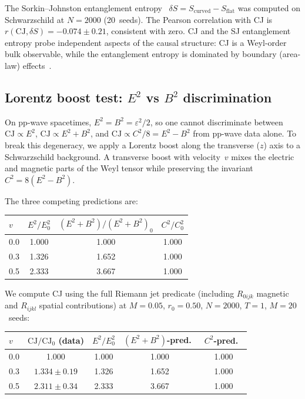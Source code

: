 \documentclass[12pt,a4paper]{article}
\theoremstyle{plain}
\theoremstyle{definition}
\theoremstyle{remark}
\newcommand{\CJ}{\mathrm{CJ}}
\begin{document}
The Sorkin--Johnston entanglement entropy~\cite{Sorkin:2012,
SorkinYazdi:2018} $\delta S = S_{\mathrm{curved}} -
S_{\mathrm{flat}}$ was computed on Schwarzschild at $N = 2000$
(20~seeds).  The Pearson correlation with CJ is
$r(\CJ, \delta S) = -0.074 \pm 0.21$, consistent with zero.
CJ and the SJ entanglement entropy probe independent aspects of
the causal structure: CJ is a Weyl-order bulk observable, while
the entanglement entropy is dominated by boundary (area-law)
effects~\cite{SorkinYazdi:2018}.

\subsection{Lorentz boost test: $E^2$ vs $B^2$ discrimination}
\label{sec:boost}

On pp-wave spacetimes, $E^2 = B^2 = \varepsilon^2/2$, so one
cannot discriminate between $\CJ \propto E^2$,
$\CJ \propto E^2 + B^2$, and $\CJ \propto C^2/8 = E^2 - B^2$
from pp-wave data alone.  To break this degeneracy, we apply a
Lorentz boost along the transverse ($z$) axis to a Schwarzschild
background.  A transverse boost with velocity~$v$ mixes the
electric and magnetic parts of the Weyl tensor while preserving
the invariant $C^2 = 8(E^2 - B^2)$.

The three competing predictions are:
\begin{center}
\begin{tabular}{lccc}
\toprule
$v$ & $E^2/E^2_0$ & $(E^2{+}B^2)/(E^2{+}B^2)_0$ & $C^2/C^2_0$ \\
\midrule
0.0 & 1.000 & 1.000 & 1.000 \\
0.3 & 1.326 & 1.652 & 1.000 \\
0.5 & 2.333 & 3.667 & 1.000 \\
\bottomrule
\end{tabular}
\end{center}

We compute CJ using the full Riemann jet predicate (including
$R_{0ijk}$ magnetic and $R_{ijkl}$ spatial contributions) at
$M = 0.05$, $r_0 = 0.50$, $N = 2000$, $T = 1$, $M = 20$~seeds:

\begin{center}
\begin{tabular}{lcccc}
\toprule
$v$ & $\CJ/\CJ_0$ (data) & $E^2/E^2_0$ & $(E^2{+}B^2)$-pred.\ & $C^2$-pred.\ \\
\midrule
0.0 & 1.000 & 1.000 & 1.000 & 1.000 \\
0.3 & $1.334 \pm 0.19$ & 1.326 & 1.652 & 1.000 \\
0.5 & $2.311 \pm 0.34$ & 2.333 & 3.667 & 1.000 \\
\bottomrule
\end{tabular}
\end{center}
\end{document}
